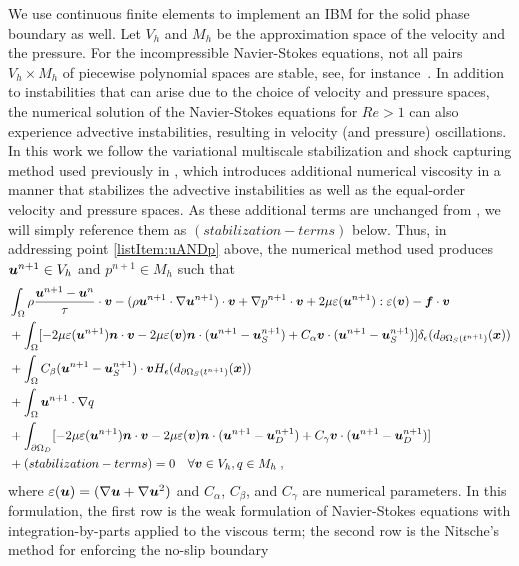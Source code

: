 We use continuous finite elements to implement an IBM for the solid phase boundary as well.
Let $V_h$ and $M_h$ be the approximation space of the velocity and the pressure. For the incompressible Navier-Stokes equations, not all pairs $V_h\times M_h$ of piecewise polynomial spaces are stable, see, for instance~\cite{Arnold1990, EG04}. In addition to instabilities that can arise due to the choice of velocity and pressure spaces, the numerical solution of the Navier-Stokes equations for $Re>1$ can also experience advective instabilities, resulting in velocity (and pressure) oscillations. In this work we follow the variational multiscale stabilization and shock capturing method used previously in \cite{KAFB11}, which introduces additional numerical viscosity in a manner that stabilizes the advective instabilities as well as the equal-order velocity and pressure spaces. As these additional terms are unchanged from \cite{KAFB11}, we will simply reference them as $(stabilization-terms)$ below. Thus, in addressing point \ref{listItem:uANDp} above, the numerical method used produces $\boldsymbol{u}^{n+1}\in V_h$ and $p^{n+1}\in M_h$ such that 
\begin{align}
&\int_\Omega\rho \frac{\boldsymbol{u}^{n+1}-\boldsymbol{u}^n}{\tau}\cdot\boldsymbol{v} - (\rho \boldsymbol{u}^{n+1}\cdot \nabla \boldsymbol{u}^{n+1})\cdot \boldsymbol{v} 
+\nabla p^{n+1}\cdot\boldsymbol{v} +2\mu\varepsilon(\boldsymbol{u}^{n+1}):\varepsilon(\boldsymbol{v})
-\boldsymbol{f}\cdot\boldsymbol{v}\nonumber\\
&+\int_\Omega [-2\mu \varepsilon(\boldsymbol{u}^{n+1})\boldsymbol{n}\cdot\boldsymbol{v}
-2\mu\varepsilon(\boldsymbol{v})\boldsymbol{n}\cdot(\boldsymbol{u}^{n+1}-\boldsymbol{u}_S^{n+1})
+C_\alpha\boldsymbol{v}\cdot(\boldsymbol{u}^{n+1}-\boldsymbol{u}_S^{n+1})]\delta_\epsilon(d_{\partial\Omega_S(t^{n+1})}(\boldsymbol{x}))\nonumber\\
&+\int_\Omega C_\beta (\boldsymbol{u}^{n+1}-\boldsymbol{u}_S^{n+1})\cdot\boldsymbol{v} H_\epsilon(d_{\partial\Omega_S(t^{n+1})}(\boldsymbol{x}))\nonumber\\
&+\int_\Omega \boldsymbol{u}^{n+1}\cdot\nabla q \nonumber\\
&+\int_{\partial\Omega_D} [-2\mu\varepsilon(\boldsymbol{u}^{n+1})\boldsymbol{n}\cdot\boldsymbol{v}
-2\mu\varepsilon(\boldsymbol{v})\boldsymbol{n}\cdot(\boldsymbol{u}^{n+1}-\boldsymbol{u}_D^{n+1})
+C_\gamma\boldsymbol{v}\cdot(\boldsymbol{u}^{n+1}-\boldsymbol{u}_D^{n+1})]\nonumber\\
&+(stabilization-terms)=0 \quad\forall \boldsymbol{v}\in V_h, q\in M_h \; ,
\end{align}
where $\varepsilon(\boldsymbol{u}) = (\nabla \boldsymbol{u} + \nabla \boldsymbol{u}^2)$ and $C_{\alpha}$, $C_{\beta}$, and $C_{\gamma}$ are numerical parameters. In this formulation, the first row is the weak formulation of Navier-Stokes equations with integration-by-parts applied to the  viscous term; the second row is the Nitsche's method for enforcing the no-slip boundary

